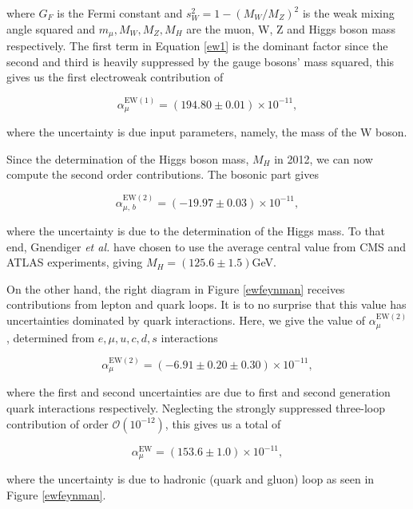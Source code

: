 \documentclass{article}
\numberwithin{equation}{section} %
\begin{document}
\noindent where $G_F$ is the Fermi constant and $s_W^2=1-(M_W/M_Z)^2$ is the weak mixing angle squared and $m_\mu, M_W, M_Z, M_H$ are the muon, W, Z and Higgs boson mass respectively. The first term in Equation \ref{ew1} is the dominant factor since the second and third is heavily suppressed by the gauge bosons' mass squared, this gives us the first electroweak contribution of\cite{gnendiger}

\begin{equation}
\alpha_\mu^\mathrm{EW(1)} = (194.80\pm 0.01)\times 10^{-11},
\label{ew1val}
\end{equation}

\noindent where the uncertainty is due input parameters, namely, the mass of the W boson. 

Since the determination of the Higgs boson mass, $M_H$ in 2012, we can now compute the second order contributions. The bosonic part gives

\begin{equation}
\alpha_{\mu, \, b}^\mathrm{EW(2)} = (-19.97 \pm 0.03)\times 10^{-11},
\end{equation}

\noindent where the uncertainty is due to the determination of the Higgs mass. To that end,  Gnendiger \textit{et al.} have chosen to use the average central value from CMS and ATLAS experiments, giving $M_H =(125.6\pm 1.5)$GeV.

On the other hand, the right diagram in Figure \ref{ewfeynman} receives contributions from lepton and quark loops. It is to no surprise that this value has uncertainties dominated by quark interactions. Here, we give the value of $\alpha_\mu^\mathrm{EW(2)}$, determined from $e, \mu, u, c , d , s$ interactions

\begin{equation}
\alpha_\mu^\mathrm{EW(2)} = (-6.91\pm 0.20\pm 0.30)\times 10^{-11},
\end{equation}

\noindent where the first and second uncertainties are due to first and second generation quark interactions respectively. Neglecting the strongly suppressed three-loop contribution of order $\mathcal{O}(10^{-12})$\cite{hoecker}, this gives us a total of

\begin{equation}
\alpha_\mu^\mathrm{EW} = (153.6\pm 1.0)\times 10^{-11},
\end{equation}

\noindent where the uncertainty is due to hadronic (quark and gluon) loop as seen in Figure \ref{ewfeynman}\cite{hoecker}.
\end{document}
